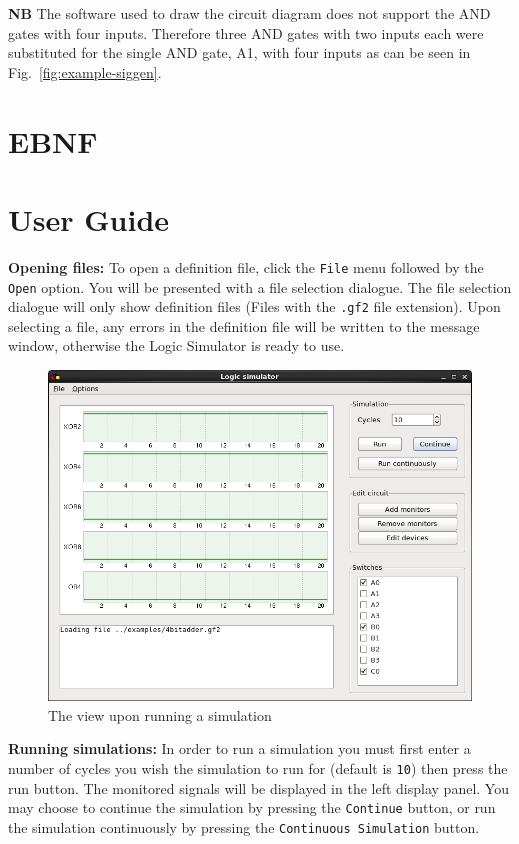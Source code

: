 \documentclass[a4paper,10pt]{article}
\begin{document}
\textbf{NB} The software used to draw the circuit diagram does not support the AND gates with four inputs. Therefore three AND gates with two inputs each were substituted for the single AND gate, A1, with four inputs as can be seen in Fig.~\ref{fig:example-siggen}.

\pagebreak

\section{EBNF}
\label{sec:EBNF}

\pagebreak

\section{User Guide}
\label{sec:guide}

\textbf{Opening files:} To open a definition file, click the \texttt{File} menu followed by the \texttt{Open} option. You will be presented with a file selection dialogue. The file selection dialogue will only show definition files (Files with the \texttt{.gf2} file extension). Upon selecting a file, any errors in the definition file will be written to the message window, otherwise the Logic Simulator is ready to use. 

\begin{figure}[h]
        \centering
        \includegraphics[width=.8\textwidth]{../../report2/jam96/simulation}
        \caption{The view upon running a simulation}
        \label{fig:simulation}
\end{figure}

\textbf{Running simulations:} In order to run a simulation you must first enter a number of cycles you wish the simulation to run for (default is \texttt{10}) then press the run button. The monitored signals will be displayed in the left display panel. You may choose to continue the simulation by pressing the \texttt{Continue} button, or run the simulation continuously by pressing the \texttt{Continuous Simulation} button.
\end{document}
